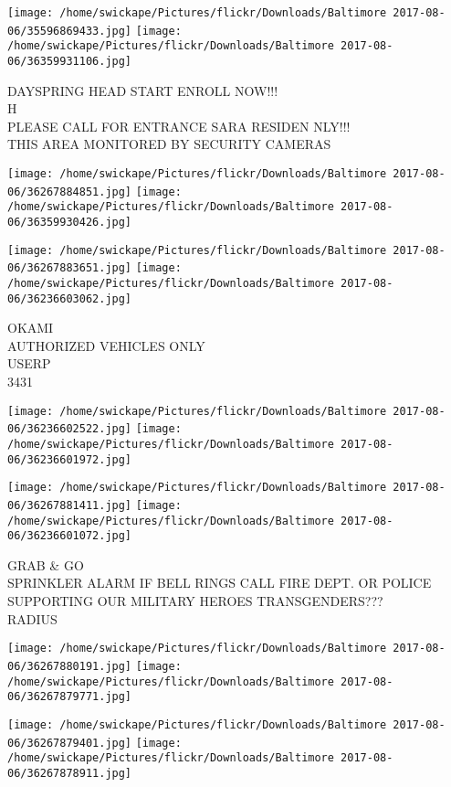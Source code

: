\documentclass[10pt,letterpaper]{article}
\begin{document}
\texttt{[image: /home/swickape/Pictures/flickr/Downloads/Baltimore 2017-08-06/35596869433.jpg]}
\texttt{[image: /home/swickape/Pictures/flickr/Downloads/Baltimore 2017-08-06/36359931106.jpg]}

DAYSPRING HEAD START ENROLL NOW!!!\\
H\\
PLEASE CALL FOR ENTRANCE SARA RESIDEN NLY!!!\\
THIS AREA MONITORED BY SECURITY CAMERAS
\pagebreak

\texttt{[image: /home/swickape/Pictures/flickr/Downloads/Baltimore 2017-08-06/36267884851.jpg]}
\texttt{[image: /home/swickape/Pictures/flickr/Downloads/Baltimore 2017-08-06/36359930426.jpg]}

\texttt{[image: /home/swickape/Pictures/flickr/Downloads/Baltimore 2017-08-06/36267883651.jpg]}
\texttt{[image: /home/swickape/Pictures/flickr/Downloads/Baltimore 2017-08-06/36236603062.jpg]}

OKAMI\\
AUTHORIZED VEHICLES ONLY\\
USERP\\
3431
\pagebreak

\texttt{[image: /home/swickape/Pictures/flickr/Downloads/Baltimore 2017-08-06/36236602522.jpg]}
\texttt{[image: /home/swickape/Pictures/flickr/Downloads/Baltimore 2017-08-06/36236601972.jpg]}

\texttt{[image: /home/swickape/Pictures/flickr/Downloads/Baltimore 2017-08-06/36267881411.jpg]}
\texttt{[image: /home/swickape/Pictures/flickr/Downloads/Baltimore 2017-08-06/36236601072.jpg]}

GRAB \& GO\\
SPRINKLER ALARM IF BELL RINGS CALL FIRE DEPT. OR POLICE\\
SUPPORTING OUR MILITARY HEROES TRANSGENDERS???\\
RADIUS
\pagebreak

\texttt{[image: /home/swickape/Pictures/flickr/Downloads/Baltimore 2017-08-06/36267880191.jpg]}
\texttt{[image: /home/swickape/Pictures/flickr/Downloads/Baltimore 2017-08-06/36267879771.jpg]}

\texttt{[image: /home/swickape/Pictures/flickr/Downloads/Baltimore 2017-08-06/36267879401.jpg]}
\texttt{[image: /home/swickape/Pictures/flickr/Downloads/Baltimore 2017-08-06/36267878911.jpg]}
\end{document}
